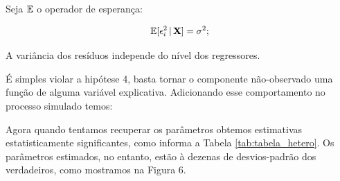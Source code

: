 \begin{hipotese}[Homocedasticidade]
Seja $\mathbb{E}$ o operador de esperança:

\begin{align}
    \mathbb{E}[\epsilon_i^2\, |\, \mathbf{X} ] = \sigma^2;
\end{align}

A variância dos resíduos independe do nível dos regressores.

\end{hipotese}

\begin{exemplo}[Heterocedasticidade]
É simples violar a hipótese 4, basta tornar o componente não-observado uma função de alguma variável explicativa. Adicionando esse comportamento no processo simulado temos:

\begin{figure}[H]
    \centering
    
\end{figure}



Agora quando tentamos recuperar os parâmetros obtemos estimativas estatisticamente significantes, como informa a Tabela \ref{tab:tabela_hetero}. Os parâmetros estimados, no entanto, estão à dezenas de desvios-padrão dos verdadeiros, como mostramos na Figura 6.


\end{exemplo}



